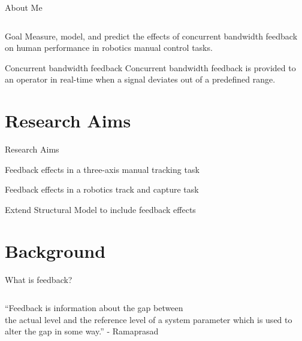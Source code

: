 \documentclass[10pt]{beamer}
\begin{document}
\begin{frame}[fragile]{About Me}
\begin{columns}[T]
\begin{column}{.5\textwidth}
    \end{column}
  \end{columns}
\end{frame}

\begin{frame}[fragile]{Goal}
  Measure, model, and predict the effects of concurrent bandwidth feedback on human performance in robotics manual control tasks.
\end{frame}

\begin{frame}[fragile]{Concurrent bandwidth feedback}
  Concurrent bandwidth feedback is provided to an operator in real-time when a signal deviates out of a predefined range.
\end{frame}

\section{Research Aims}

\begin{frame}[fragile]{Research Aims}
  \begin{description}[align=right]
    \setlength\itemsep{1em}
    \item [Aim One] Feedback effects in a three-axis manual tracking task
    \item [Aim Two] Feedback effects in a robotics track and capture task
    \item [Aim Three] Extend Structural Model to include feedback effects
  \end{description}
\end{frame}

\section{Background}

\begin{frame}[fragile]{What is feedback?}
  \begin{columns}[T]
    \begin{column}{.8\textwidth}
      \begin{block}{}
        ``Feedback is information about the gap between\\ the actual level and the reference level of a system parameter which is used to alter the gap in some way.'' - Ramaprasad~\cite{Ramaprasad1983}
      \end{block}
    \end{column}
  \end{columns}
\end{frame}
\end{document}
